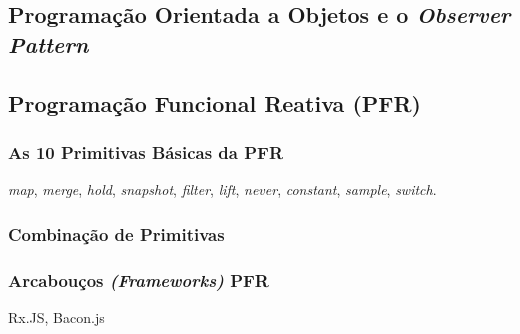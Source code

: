 \subsection{Programação Orientada a Objetos e o \emph{Observer Pattern}}


\subsection{Programação Funcional Reativa (PFR)}
\label{sec:pfr}




\subsubsection{As 10 Primitivas Básicas da PFR}
\label{sec:pfr-10-primitivas}

\emph{map}, \emph{merge}, \emph{hold}, \emph{snapshot}, \emph{filter},
\emph{lift}, \emph{never}, \emph{constant}, \emph{sample}, \emph{switch}.

\subsubsection{Combinação de Primitivas}
\label{sec:pfr-combinacao}

\subsubsection{Arcabouços \emph{(Frameworks)} PFR}
\label{sec:pfr-frameworks}

Rx.JS, Bacon.js

